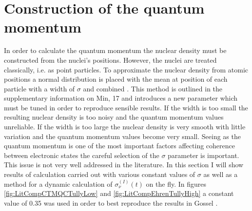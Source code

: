 \section{Construction of the quantum momentum}
\label{sect:SigmaSect}
In order to calculate the quantum momentum the nuclear density must be constructed from the nuclei's positions. However, the nuclei are treated classically, i.e. as point particles. To approximate the nuclear density from atomic positions a normal distribution is placed with the mean at position of each particle with a width of $\sigma$ and combined . This method is outlined in the supplementary information on Min, 17 \cite{min_ab_2017} and introduces a new parameter which must be tuned in order to reproduce sensible results. If the width is too small the resulting nuclear density is too noisy and the quantum momentum values unreliable. If the width is too large the nuclear density is very smooth with little variation and the quantum momentum values become very small. Seeing as the quantum momentum is one of the most important factors affecting coherence between electronic states the careful selection of the $\sigma$ parameter is important. This issue is not very well addressed in the literature. In this section I will show results of calculation carried out with various constant values of $\sigma$ as well as a method for a dynamic calculation of $\sigma^{(I)}_{\nu}(t)$ on the fly. In figures \ref{fig:LitCompCTMQCTullyLow} and \ref{fig:LitCompEhrenTullyHigh} a constant value of 0.35 was used in order to best reproduce the results in Gossel \cite{gossel_coupled-trajectory_2018}.

